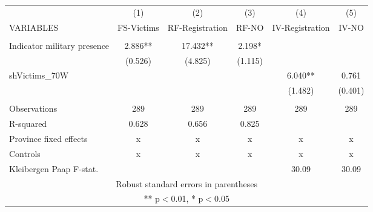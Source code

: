 \begin{tabular}{lccccc} \hline
 & (1) & (2) & (3) & (4) & (5) \\
VARIABLES & FS-Victims & RF-Registration & RF-NO & IV-Registration & IV-NO \\ \hline
 &  &  &  &  &  \\
Indicator military presence & 2.886** & 17.432** & 2.198* &  &  \\
 & (0.526) & (4.825) & (1.115) &  &  \\
shVictims\_70W &  &  &  & 6.040** & 0.761 \\
 &  &  &  & (1.482) & (0.401) \\
 &  &  &  &  &  \\
Observations & 289 & 289 & 289 & 289 & 289 \\
R-squared & 0.628 & 0.656 & 0.825 &  &  \\
Province fixed effects & x & x & x & x & x \\
Controls & x & x & x & x & x \\
 Kleibergen Paap F-stat. &  &  &  & 30.09 & 30.09 \\ \hline
\multicolumn{6}{c}{ Robust standard errors in parentheses} \\
\multicolumn{6}{c}{ ** p$<$0.01, * p$<$0.05} \\
\end{tabular}
